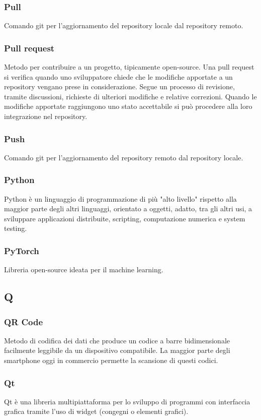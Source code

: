 \subsubsection*{Pull} Comando git per l'aggiornamento del repository locale dal repository remoto.
\subsubsection*{Pull request} Metodo per contribuire a un progetto, tipicamente open-source. Una pull request si verifica quando uno sviluppatore chiede che le modifiche apportate a un repository vengano prese in considerazione. Segue un processo di revisione, tramite discussioni, richieste di ulteriori modifiche e relative correzioni. Quando le modifiche apportate raggiungono uno stato accettabile si può procedere alla loro integrazione nel repository.
\subsubsection*{Push} Comando git per l'aggiornamento del repository remoto dal repository locale.
\subsubsection*{Python} Python è un linguaggio di programmazione di più "alto livello" rispetto alla maggior parte degli altri linguaggi, orientato a oggetti, adatto, tra gli altri usi, a sviluppare applicazioni distribuite, scripting, computazione numerica e system testing.
\subsubsection*{PyTorch} Libreria open-source ideata per il machine learning.
\subsection*{Q}
\subsubsection*{QR Code} Metodo di codifica dei dati che produce un codice a barre bidimensionale facilmente leggibile da un dispositivo compatibile. La maggior parte degli smartphone oggi in commercio permette la scansione di questi codici.
\subsubsection*{Qt} Qt è una libreria multipiattaforma per lo sviluppo di programmi con interfaccia grafica tramite l'uso di widget (congegni o elementi grafici).
